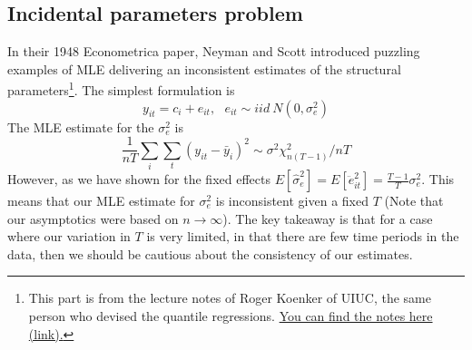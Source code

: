 \documentclass[12pt]{article}
\theoremstyle{definition}
\theoremstyle{property}
\theoremstyle{assumption}
\theoremstyle{example}
\theoremstyle{comment}
\begin{document}
\subsection{Incidental parameters problem}
In their 1948 Econometrica paper, Neyman and Scott introduced puzzling examples of MLE delivering an inconsistent estimates of the structural parameters\footnote{This part is from the lecture notes of Roger Koenker of UIUC, the same person who devised the quantile regressions. \href{http://www.econ.uiuc.edu/~roger/courses/508/old/2012/L18.pdf}{You can find the notes here (link).}}. The simplest formulation is
\[
y_{it} = c_i + e_{it},\ \ \ e_{it}\sim iid \ N(0,\sigma_e^2)
\] 
The MLE estimate for the $\sigma_e^2$ is
\[
\frac{1}{nT}\sum_i\sum_t(y_{it}-\bar{y}_i)^2 \sim \sigma^2 \chi^2_{n(T-1)}/nT
\]
However, as we have shown for the fixed effects $E[\hat{\sigma}_e^2]=E[\ddot{e}_{it}^2]=\frac{T-1}{T}\sigma_e^2$. This means that our MLE estimate for $\sigma_e^2$ is inconsistent given a fixed $T$ (Note that our asymptotics were based on $n\to\infty$). The key takeaway is that for a case where our variation in $T$ is very limited, in that there are few time periods in the data, then we should be cautious about the consistency of our estimates. 
\end{document}
